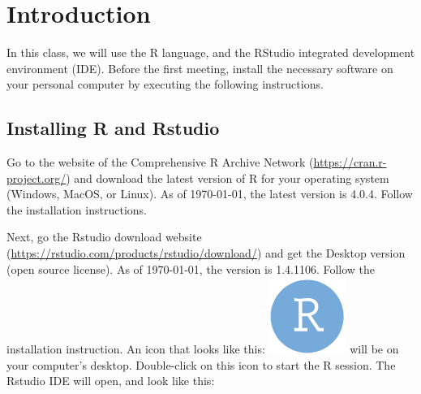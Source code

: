 \hypertarget{intro}{%
\chapter{Introduction}\label{intro}}

In this class, we will use the R language, and the RStudio integrated development environment (IDE). Before the first meeting, install the necessary software on your personal computer by executing the following instructions.

\hypertarget{installing-r-and-rstudio}{%
\section{Installing R and Rstudio}\label{installing-r-and-rstudio}}

Go to the website of the Comprehensive R Archive Network (\url{https://cran.r-project.org/}) and download the latest version of R for your operating system (Windows, MacOS, or Linux). As of \today, the latest version is 4.0.4. Follow the installation instructions.

Next, go the Rstudio download website
(\url{https://rstudio.com/products/rstudio/download/}) and get the Desktop version
(open source license). As of \today, the version is 1.4.1106. Follow the
installation instruction. An icon that looks like this:
\includegraphics[width=\textwidth,height=0.025\textheight]{images/RstudioLogo.png}
will be on your computer's desktop. Double-click on this icon to start the R session. The Rstudio IDE will open, and look like this:

